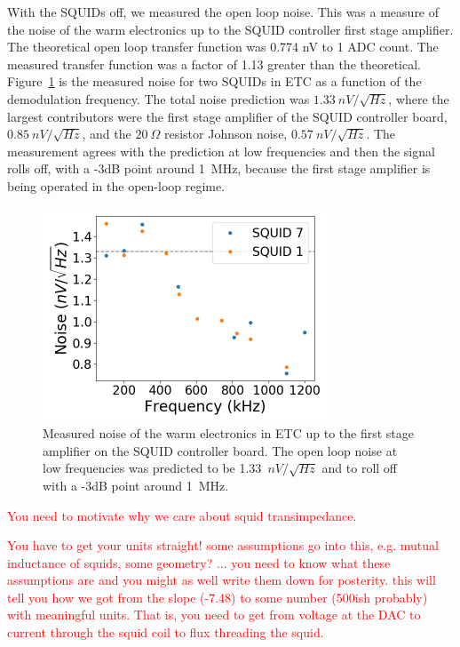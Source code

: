 With the \ac{SQUID}s off, we measured the open loop noise.
This was a measure of the noise of the warm electronics up to the \ac{SQUID} controller first stage amplifier. 
The theoretical open loop transfer function was 0.774 nV to 1 \ac{ADC} count. 
The measured transfer function was a factor of 1.13 greater than the theoretical. 
Figure~\ref{fig:dark_electronic_noise} is the measured noise for two \ac{SQUID}s in \ac{ETC} as a function of the demodulation frequency. 
The total noise prediction was $1.33~nV/\sqrt{Hz}$, where the largest contributors were the first stage amplifier of the \ac{SQUID} controller board, $0.85~nV/\sqrt{Hz}$, and the $20~\Omega$ resistor Johnson noise, $0.57~nV/\sqrt{Hz}$. 
The measurement agrees with the prediction at low frequencies and then the signal rolls off, with a -3dB point around 1~MHz, because the first stage amplifier is being operated in the open-loop regime.  

\begin{figure}[ht!]
\begin{center}
\includegraphics[height=2.5in]{figures/warm_electronic_noise.png}
\caption{Measured noise of the warm electronics in \ac{ETC} up to the first stage amplifier on the \ac{SQUID} controller board. The open loop noise at low frequencies was predicted to be 1.33~$nV/\sqrt{Hz}$ and to roll off with a -3dB point around 1~MHz. 
\label{fig:dark_electronic_noise} }
\end{center}
\end{figure}

\textcolor{red}{You need to motivate why we care about squid transimpedance.}

\textcolor{red}{You have to get your units straight! some assumptions go into this, e.g. mutual inductance of squids, some geometry? ... you need to know what these assumptions are and you might as well write them down for posterity. this will tell you how we got from the slope (-7.48) to some number (500ish probably) with meaningful units. That is, you need to get from voltage at the DAC to current through the squid coil to flux threading the squid.}


